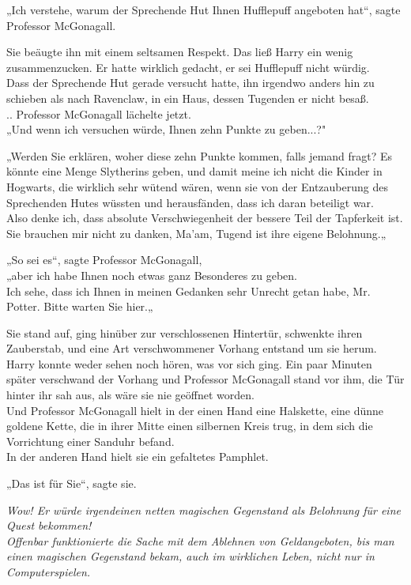 {„Ich verstehe, warum der Sprechende Hut Ihnen Hufflepuff angeboten hat“, sagte Professor McGonagall.

Sie beäugte ihn mit einem seltsamen Respekt. Das ließ Harry ein wenig zusammenzucken. Er hatte wirklich gedacht, er sei Hufflepuff nicht würdig.\\ Dass der Sprechende Hut gerade versucht hatte, ihn irgendwo anders hin zu schieben als nach Ravenclaw, in ein Haus, dessen Tugenden er nicht besaß.\\ .. Professor McGonagall lächelte jetzt.\\ „Und wenn ich versuchen würde, Ihnen zehn Punkte zu geben...?"

„Werden Sie erklären, woher diese zehn Punkte kommen, falls jemand fragt? Es könnte eine Menge Slytherins geben, und damit meine ich nicht die Kinder in Hogwarts, die wirklich sehr wütend wären, wenn sie von der Entzauberung des Sprechenden Hutes wüssten und herausfänden, dass ich daran beteiligt war.\\ Also denke ich, dass absolute Verschwiegenheit der bessere Teil der Tapferkeit ist. Sie brauchen mir nicht zu danken, Ma'am, Tugend ist ihre eigene Belohnung.„

„So sei es“, sagte Professor McGonagall,\\ „aber ich habe Ihnen noch etwas ganz Besonderes zu geben.\\ Ich sehe, dass ich Ihnen in meinen Gedanken sehr Unrecht getan habe, Mr. Potter. Bitte warten Sie hier.„

Sie stand auf, ging hinüber zur verschlossenen Hintertür, schwenkte ihren Zauberstab, und eine Art verschwommener Vorhang entstand um sie herum.\\ Harry konnte weder sehen noch hören, was vor sich ging. Ein paar Minuten später verschwand der Vorhang und Professor McGonagall stand vor ihm, die Tür hinter ihr sah aus, als wäre sie nie geöffnet worden.\\ Und Professor McGonagall hielt in der einen Hand eine Halskette, eine dünne goldene Kette, die in ihrer Mitte einen silbernen Kreis trug, in dem sich die Vorrichtung einer Sanduhr befand.\\ In der anderen Hand hielt sie ein gefaltetes Pamphlet.

„Das ist für Sie“, sagte sie.

\emph{Wow! Er würde irgendeinen netten magischen Gegenstand als Belohnung für eine Quest bekommen!\\ Offenbar funktionierte die Sache mit dem Ablehnen von Geldangeboten, bis man einen magischen Gegenstand bekam, auch im wirklichen Leben, nicht nur in Computerspielen.}

}
